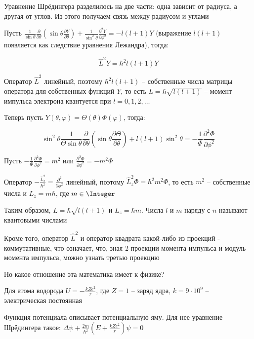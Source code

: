 \documentclass[12pt]{article}
\begin{document}
Уравнение Шрёдингера разделилось на две части: одна зависит от радиуса, а другая от углов. Из этого получаем связь между радиусом и углами

Пусть $\frac{1}{\sin\theta}\frac{\partial }{\partial \theta}\left(\sin\theta\frac{\partial Y}{\partial \theta}\right) + \frac{1}{\sin^2\theta}\frac{\partial^2 Y}{\partial \phi^2} = -l(l + 1) Y$ (выражение $l (l + 1)$ появляется как следствие уравнения Лежандра), тогда:

\[\hat L^2 Y = \hbar^2 l (l + 1) Y\]

Оператор $\hat L^2$ линейный, поэтому $\hbar^2 l (l + 1)$ -- собственные числа матрицы оператора для собственных функций $Y$, то есть $L = \hbar \sqrt{l (l + 1)}$ -- момент импульса электрона квантуется при $l = 0, 1, 2, \dots$

\mediumvspace

Теперь пусть $Y(\theta, \varphi) = \Theta (\theta) \Phi (\varphi)$, тогда:

\[\sin^2 \theta \frac{1}{\Theta \sin\theta}\frac{\partial }{\partial \theta}\left(\sin\theta\frac{\partial \Theta}{\partial \theta}\right) + l(l + 1) \sin^2 \theta = -\frac{1}{\Phi}\frac{\partial^2 \Phi}{\partial \phi^2}\]

Пусть $-\frac{1}{\Phi} \frac{\partial^2 \Phi}{\partial \phi^2} = m^2$ или $\frac{\partial^2 \Phi}{\partial \phi^2} = -m^2 \Phi$

Оператор $-\frac{\hat L_z^2}{\hbar^2} = \frac{\partial^2}{\partial \phi^2}$ линейный, поэтому $\hat L_z^2 \Phi = \hbar^2 m^2 \Phi$, то есть $m^2$ -- собственные числа и $L_z = m \hbar$, где $m \in \Integer$

\mediumvspace

Таким образом, $L = \hbar \sqrt{l (l + 1)}$ и $L_z = \hbar m$. Числа $l$ и $m$ наряду с $n$ называют квантовыми числами

Кроме того, оператор $\hat L^2$ и оператор квадрата какой-либо из проекций - коммутативные, что означает, что, зная 2 проекции момента импульса и модуль момента импульса, можно узнать третью проекцию

\mediumvspace

Но какое отношение эта математика имеет к физике? 

Для атома водорода $U = -\frac{k Z e^2}{r}$, где $Z = 1$ -- заряд ядра, $k = 9 \cdot 10^9$ -- электрическая постоянная

Функция потенциала описывает потенциальную яму. Для нее уравнение Шрёдингера такое: $\Delta \psi + \frac{2m}{\hbar^2} \left(E + \frac{k Z e^2}{r}\right) \psi = 0$
\end{document}
